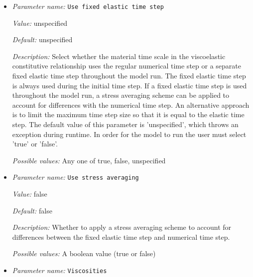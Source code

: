 \begin{itemize}
{\it Default:} 4.e-5


{\it Description:} List of thermal expansivities for background mantle and compositional fields, for a total of N+1 values, where N is the number of compositional fields. If only one value is given, then all use the same value. Units: $1/K$


{\it Possible values:} A list of 0 to 4294967295 elements where each element is [A floating point number $v$ such that $0 \leq v \leq \text{MAX\_DOUBLE}$]
\item {\it Parameter name:} {\tt Use fixed elastic time step}
\label{parameters:Material model/Viscoelastic/Use fixed elastic time step}


{\it Value:} unspecified


{\it Default:} unspecified


{\it Description:} Select whether the material time scale in the viscoelastic constitutive relationship uses the regular numerical time step or a separate fixed elastic time step throughout the model run. The fixed elastic time step is always used during the initial time step. If a fixed elastic time step is used throughout the model run, a stress averaging scheme can be applied to account for differences with the numerical time step. An alternative approach is to limit the maximum time step size so that it is equal to the elastic time step. The default value of this parameter is 'unspecified', which throws an exception during runtime. In order for the model to run the user must select 'true' or 'false'.


{\it Possible values:} Any one of true, false, unspecified
\item {\it Parameter name:} {\tt Use stress averaging}
\label{parameters:Material model/Viscoelastic/Use stress averaging}


{\it Value:} false


{\it Default:} false


{\it Description:} Whether to apply a stress averaging scheme to account for differences between the fixed elastic time step and numerical time step. 


{\it Possible values:} A boolean value (true or false)
\item {\it Parameter name:} {\tt Viscosities}
\label{parameters:Material model/Viscoelastic/Viscosities}



\end{itemize}
